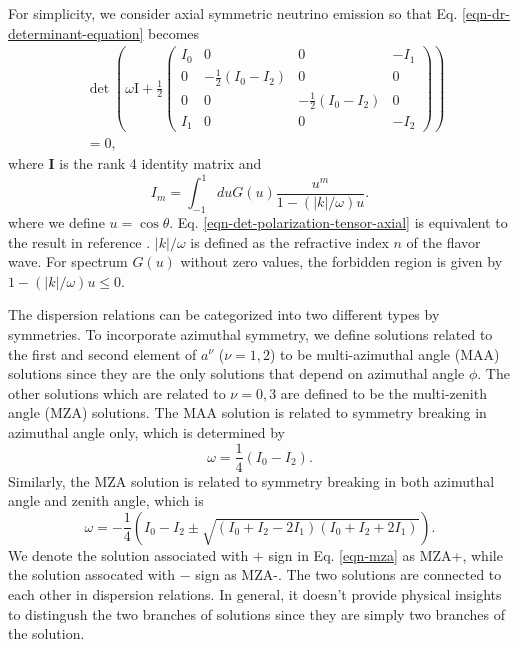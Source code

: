 For simplicity, we consider axial symmetric neutrino emission so that Eq. \eqref{eqn-dr-determinant-equation} becomes
\begin{align}
&\det \left( \omega \mathrm{I} + \frac{1}{2}
\begin{pmatrix}
   I_0 & 0 & 0 & -I_1 \\
   0 & -\frac{1}{2} (I_0 - I_2) & 0 & 0 \\
   0 & 0 & -\frac{1}{2} (I_0 - I_2) & 0 \\
   I_1 & 0 & 0 & -I_2
\end{pmatrix}\right) \nonumber\\
&=0,
\label{eqn-det-polarization-tensor-axial}
\end{align}
where $\mathbf I$ is the rank 4 identity matrix and
\begin{equation}
   I_m =\int_{-1}^{1} d u G(u) \frac{u^m}{1 -  \left(\lvert k\rvert /\omega\right) u }.
\end{equation}
where we define $u=\cos\theta$. Eq. \eqref{eqn-det-polarization-tensor-axial} is equivalent to the result in reference \cite{Raffelt2013}. $\lvert k \rvert /\omega$ is defined as the refractive index $n$ of the flavor wave. For spectrum $G(u)$ without zero values, the forbidden region is given by $1 -  \left(\lvert k\rvert /\omega\right) u\leq 0$.

The dispersion relations can be categorized into two different types by symmetries. To incorporate azimuthal symmetry, we define solutions related to the first and second element of $a^\nu$ ($\nu=1,2$) to be multi-azimuthal angle (MAA) solutions since they are the only solutions that depend on azimuthal angle $\phi$. The other solutions which are related to $\nu=0,3$ are defined to be the multi-zenith angle (MZA) solutions. The MAA solution is related to symmetry breaking in azimuthal angle only, which is determined by
\begin{equation}
   \omega = \frac{1}{4}(I_0 - I_2).
   \label{eqn-maa}
\end{equation}
Similarly, the MZA solution is related to symmetry breaking in both azimuthal angle and zenith angle, which is
\begin{equation}
\omega = - \frac{1}{4} \left( I_0 - I_2 \pm \sqrt{ (I_0 + I_2 - 2 I_1) (I_0 + I_2 + 2 I_1) } \right).
\label{eqn-mza}
\end{equation}
We denote the solution associated with $+$ sign in Eq. \eqref{eqn-mza} as MZA+, while the solution assocated with $-$ sign as MZA-. The two solutions are connected to each other in dispersion relations. In general, it doesn't provide physical insights to distingush the two branches of solutions since they are simply two branches of the solution.

